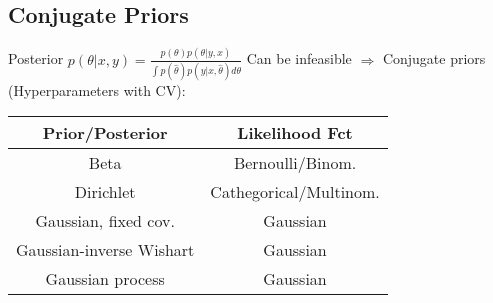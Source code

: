 \subsection{Conjugate Priors}

Posterior $p(\theta|x,y) = \frac{p(\theta)p(\theta|y,x)}{\int p(\hat\theta)p(y|x,\hat\theta)d\theta}$ Can be infeasible $\Rightarrow$ Conjugate priors (Hyperparameters with CV):

\begin{center}
    \begin{tabular}{|c|c|}
        \hline
        \textbf{Prior/Posterior} & \textbf{Likelihood Fct} \\
        \hline
        Beta & Bernoulli/Binom.\\
        \hline
        Dirichlet & Cathegorical/Multinom.\\
        \hline
        Gaussian, fixed cov. & Gaussian  \\
        \hline
        Gaussian-inverse Wishart & Gaussian  \\
        \hline
        Gaussian process & Gaussian  \\
        \hline
    \end{tabular}
\end{center}



